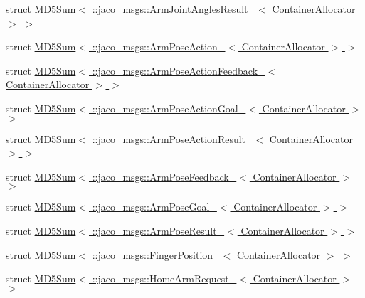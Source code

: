 \begin{DoxyCompactItemize}
\item 
struct \hyperlink{structros_1_1message__traits_1_1MD5Sum_3_01_1_1jaco__msgs_1_1ArmJointAnglesResult___3_01ContainerAllocator_01_4_01_4}{M\+D5\+Sum$<$ \+::jaco\+\_\+msgs\+::\+Arm\+Joint\+Angles\+Result\+\_\+$<$ Container\+Allocator $>$ $>$}
\item 
struct \hyperlink{structros_1_1message__traits_1_1MD5Sum_3_01_1_1jaco__msgs_1_1ArmPoseAction___3_01ContainerAllocator_01_4_01_4}{M\+D5\+Sum$<$ \+::jaco\+\_\+msgs\+::\+Arm\+Pose\+Action\+\_\+$<$ Container\+Allocator $>$ $>$}
\item 
struct \hyperlink{structros_1_1message__traits_1_1MD5Sum_3_01_1_1jaco__msgs_1_1ArmPoseActionFeedback___3_01ContainerAllocator_01_4_01_4}{M\+D5\+Sum$<$ \+::jaco\+\_\+msgs\+::\+Arm\+Pose\+Action\+Feedback\+\_\+$<$ Container\+Allocator $>$ $>$}
\item 
struct \hyperlink{structros_1_1message__traits_1_1MD5Sum_3_01_1_1jaco__msgs_1_1ArmPoseActionGoal___3_01ContainerAllocator_01_4_01_4}{M\+D5\+Sum$<$ \+::jaco\+\_\+msgs\+::\+Arm\+Pose\+Action\+Goal\+\_\+$<$ Container\+Allocator $>$ $>$}
\item 
struct \hyperlink{structros_1_1message__traits_1_1MD5Sum_3_01_1_1jaco__msgs_1_1ArmPoseActionResult___3_01ContainerAllocator_01_4_01_4}{M\+D5\+Sum$<$ \+::jaco\+\_\+msgs\+::\+Arm\+Pose\+Action\+Result\+\_\+$<$ Container\+Allocator $>$ $>$}
\item 
struct \hyperlink{structros_1_1message__traits_1_1MD5Sum_3_01_1_1jaco__msgs_1_1ArmPoseFeedback___3_01ContainerAllocator_01_4_01_4}{M\+D5\+Sum$<$ \+::jaco\+\_\+msgs\+::\+Arm\+Pose\+Feedback\+\_\+$<$ Container\+Allocator $>$ $>$}
\item 
struct \hyperlink{structros_1_1message__traits_1_1MD5Sum_3_01_1_1jaco__msgs_1_1ArmPoseGoal___3_01ContainerAllocator_01_4_01_4}{M\+D5\+Sum$<$ \+::jaco\+\_\+msgs\+::\+Arm\+Pose\+Goal\+\_\+$<$ Container\+Allocator $>$ $>$}
\item 
struct \hyperlink{structros_1_1message__traits_1_1MD5Sum_3_01_1_1jaco__msgs_1_1ArmPoseResult___3_01ContainerAllocator_01_4_01_4}{M\+D5\+Sum$<$ \+::jaco\+\_\+msgs\+::\+Arm\+Pose\+Result\+\_\+$<$ Container\+Allocator $>$ $>$}
\item 
struct \hyperlink{structros_1_1message__traits_1_1MD5Sum_3_01_1_1jaco__msgs_1_1FingerPosition___3_01ContainerAllocator_01_4_01_4}{M\+D5\+Sum$<$ \+::jaco\+\_\+msgs\+::\+Finger\+Position\+\_\+$<$ Container\+Allocator $>$ $>$}
\item 
struct \hyperlink{structros_1_1message__traits_1_1MD5Sum_3_01_1_1jaco__msgs_1_1HomeArmRequest___3_01ContainerAllocator_01_4_01_4}{M\+D5\+Sum$<$ \+::jaco\+\_\+msgs\+::\+Home\+Arm\+Request\+\_\+$<$ Container\+Allocator $>$ $>$}

\end{DoxyCompactItemize}
